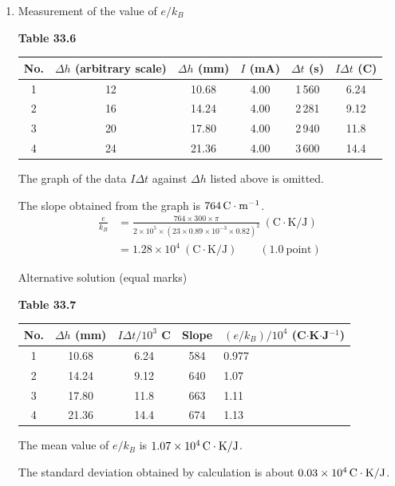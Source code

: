 \begin{enumerate}[label=(\arabic*)]
\item Measurement of the value of $e/k_B$

\begin{center}
\small\textbf{Table 33.6}
\end{center}
\begin{center}
\small
\begin{tabular}{cccccc}
\toprule
No. & $\Delta h$ (arbitrary scale) & $\Delta h$ (mm) & $I$ (mA) & $\Delta t$ (s) & $I\Delta t$ (C) \\
\midrule
1 & 12 & 10.68 & 4.00 & 1\,560 & 6.24 \\
2 & 16 & 14.24 & 4.00 & 2\,281 & 9.12 \\
3 & 20 & 17.80 & 4.00 & 2\,940 & 11.8 \\
4 & 24 & 21.36 & 4.00 & 3\,600 & 14.4 \\
\bottomrule
\end{tabular}
\end{center}

The graph of the data $I\Delta t$ against $\Delta h$ listed above is omitted.

The slope obtained from the graph is $764\,\mathrm{C\cdot m^{-1}}$.
\begin{align*}
\frac{e}{k_B} &= \frac{764\times300\times\pi}{2\times10^{5}\times(23\times0.89\times10^{-3}\times0.82)^2}\ (\mathrm{C\cdot K/J})\\
&= 1.28\times10^{4}\ (\mathrm{C\cdot K/J}) \qquad (1.0\ \text{point})
\end{align*}

Alternative solution (equal marks)

\begin{center}
\small\textbf{Table 33.7}
\end{center}
\begin{center}
\small
\begin{tabular}{ccccp{2.6cm}}
\toprule
No. & $\Delta h$ (mm) & $I\Delta t/10^{3}$ C & Slope & $(e/k_B)/10^{4}$ (C$\cdot$K$\cdot$J$^{-1}$) \\
\midrule
1 & 10.68 & 6.24 & 584 & 0.977 \\
2 & 14.24 & 9.12 & 640 & 1.07 \\
3 & 17.80 & 11.8 & 663 & 1.11 \\
4 & 21.36 & 14.4 & 674 & 1.13 \\
\bottomrule
\end{tabular}
\end{center}

The mean value of $e/k_B$ is $1.07\times10^{4}\,\mathrm{C\cdot K/J}$.

The standard deviation obtained by calculation is about $0.03\times10^{4}\,\mathrm{C\cdot K/J}$.

\end{enumerate}

